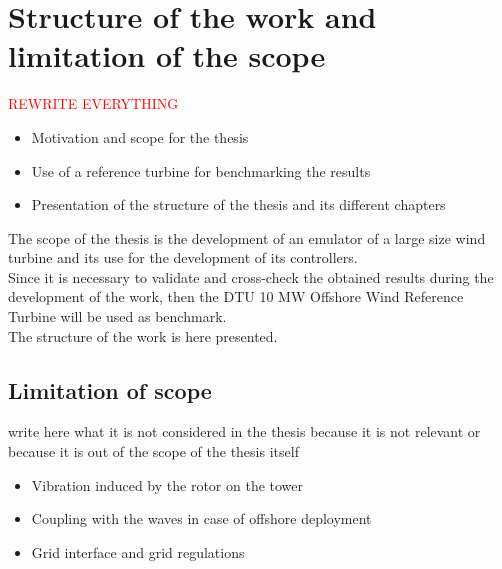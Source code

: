 \newpage
\section{Structure of the work and limitation of the scope}

\textcolor{red}{REWRITE EVERYTHING}
\begin{itemize}
    \item Motivation and scope for the thesis
    \item Use of a reference turbine for benchmarking the results
    \item Presentation of the structure of the thesis and its different chapters
\end{itemize}


The scope of the thesis is the development of an emulator of a large size wind turbine and its use for the development of its controllers.\\

Since it is necessary to validate and cross-check the obtained results during the development of the work, then the DTU 10 MW Offshore Wind Reference Turbine will be used as benchmark.\\

The structure of the work is here presented.\\

\subsection{Limitation of scope}\label{sec:limitation_of_scope}
write here what it is not considered in the thesis because it is not relevant or because it is out of the scope of the thesis itself
\begin{itemize}
    \item Vibration induced by the rotor on the tower
    \item Coupling with the waves in case of offshore deployment
    \item Grid interface and grid regulations
\end{itemize}
